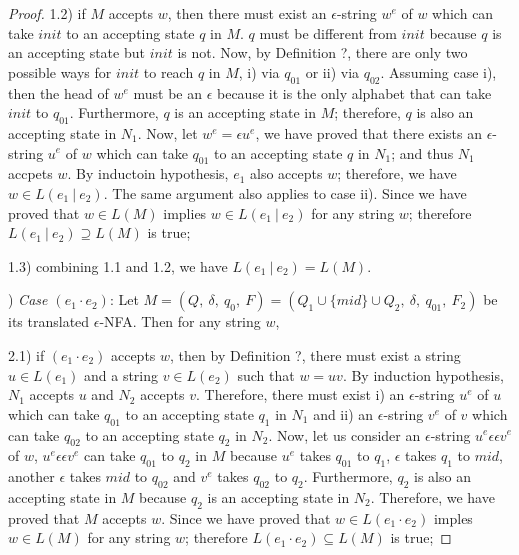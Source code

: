 \begin{proof}
\par 1.2) if \(M\) accepts \(w\), then there must exist an
\(\epsilon\)-string \(w^e\) of \(w\) which can take \(init\) to an
accepting state \(q\) in \(M\). \(q\) must be different from \(init\) because
\(q\) is an accepting state but \(init\) is not. Now, by Definition
?, there are only two possible ways for \(init\) to reach \(q\) in \(M\), i)
via \(q_{01}\) or ii) via \(q_{02}\). Assuming case i), then the head of \(w^e\)
must be an \(\epsilon\) because it is the only alphabet that can take
\(init\) to \(q_{01}\). Furthermore, \(q\) is an
accepting state in \(M\); therefore, \(q\) is also an accepting
state in \(N_1\). Now, let \(w^e = \epsilon u^e\), we have proved that
there exists an \(\epsilon\)-string \(u^e\) of \(w\) which can take
\(q_{01}\) to an accepting state \(q\) in \(N_1\); and thus \(N_1\)
accpets \(w\). By inductoin hypothesis, \(e_1\) also accepts \(w\);
therefore, we have \(w \in L(e_1\ |\ e_2)\). The same argument also
applies to case ii). Since we have proved that \(w \in L(M)\) implies
\(w \in L(e_1\ |\ e_2)\) for any string \(w\); therefore \(L(e_1\ |\
e_2) \supseteq L(M)\) is true; 

\par 1.3) combining 1.1 and 1.2, we have \(L(e_1\ |\ e_2) = L(M)\). 

\par {}) \textit{Case \((e_1 \cdot e_2)\)}: Let \(M = (Q,\
\delta,\ q_0,\ F) = (Q_1 \cup \{mid\} \cup Q_2,\ \delta,\ q_{01},\
F_2)\) be its translated \(\epsilon\)-NFA. Then for any string
\(w\), 

\par 2.1) if \((e_1 \cdot e_2)\) accepts \(w\), then by Definition
?, there must exist a string \(u \in L(e_1)\) and a string \(v \in L(e_2)\) such that \(w
= uv\). By induction hypothesis, \(N_1\) accepts \(u\) and \(N_2\)
accepts \(v\). Therefore, there must exist i) an \(\epsilon\)-string \(u^e\)
of \(u\) which can take \(q_{01}\) to an accepting state \(q_1\) in
\(N_1\) and ii) an \(\epsilon\)-string \(v^e\) of \(v\) which can take
\(q_{02}\) to an accepting state \(q_2\) in \(N_2\). Now, let us consider an \(\epsilon\)-string \(u^e\epsilon \epsilon
v^e\) of \(w\), \(u^e\epsilon \epsilon
v^e\) can take \(q_{01}\) to \(q_2\) in \(M\) because \(u^e\) takes
\(q_{01}\) to \(q_1\), \(\epsilon\) takes \(q_1\) to \(mid\), another
\(\epsilon\) takes \(mid\) to \(q_{02}\) and \(v^e\) takes \(q_{02}\)
to \(q_2\). Furthermore, \(q_2\)
is also an accepting state in \(M\) because \(q_2\) is an accepting
state in \(N_2\). Therefore, we have proved that \(M\) accepts \(w\). 
Since we have proved that \(w \in L(e_1 \cdot e_2)\) imples 
\(w \in L(M)\) for any string \(w\); therefore \(L(e_1 \cdot e_2) \subseteq L(M)\) is true; 


\end{proof}
